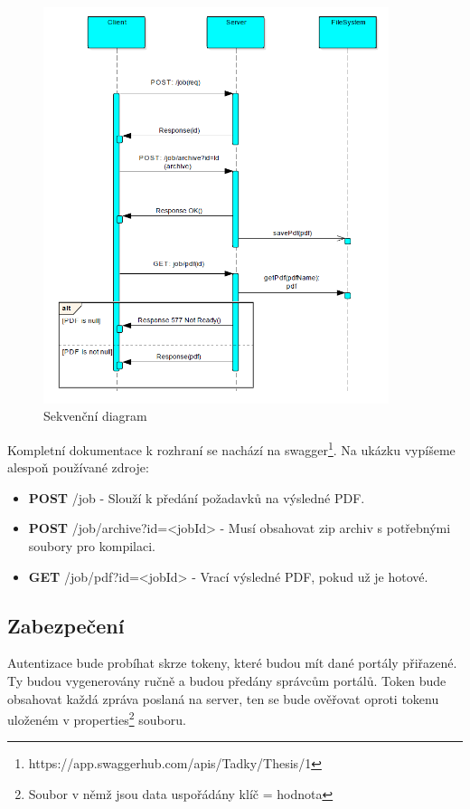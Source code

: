 \begin{figure}[H]
	\includegraphics[width=0.9\textwidth]{diagram}
	\centering
	\caption{Sekvenční diagram}
	\label{fig:seq}
\end{figure}

Kompletní dokumentace k rozhraní se nachází na swagger\footnote{https://app.swaggerhub.com/apis/Tadky/Thesis/1}. Na ukázku vypíšeme alespoň používané zdroje:
\begin{itemize}
	\item \textbf{POST} {\ttfamily /job} - Slouží k předání požadavků na výsledné PDF.
	\item \textbf{POST} {\ttfamily /job/archive?id=<jobId>} - Musí obsahovat zip archiv s potřebnými soubory pro kompilaci.
	\item \textbf{GET} {\ttfamily /job/pdf?id=<jobId>} - Vrací výsledné PDF, pokud už je hotové.
\end{itemize}

\subsection{Zabezpečení}
Autentizace bude probíhat skrze tokeny, které budou mít dané portály přiřazené. Ty budou vygenerovány ručně a budou předány správcům portálů. Token bude obsahovat každá zpráva poslaná na server, ten se bude ověřovat oproti tokenu uloženém v properties\footnote{Soubor v němž jsou data uspořádány klíč = hodnota} souboru.


